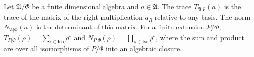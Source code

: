 Let $\mathfrak{A}/\Phi$ be a finite dimensional algebra and $a \in \mathfrak{A}$. The trace $T_{\mathfrak{A}|\Phi}(a)$ is the trace of the matrix of the right multiplication $a_R$ relative to any basis. The norm $N_{\mathfrak{A}|\Phi}(a)$ is the determinant of this matrix. For a finite extension $P/\Phi$, $T_{P|\Phi}(\rho) = \sum_{s \in \text{Iso}} \rho^s$ and $N_{P|\Phi}(\rho) = \prod_{s \in \text{Iso}} \rho^s$, where the sum and product are over all isomorphisms of $P/\Phi$ into an algebraic closure.
